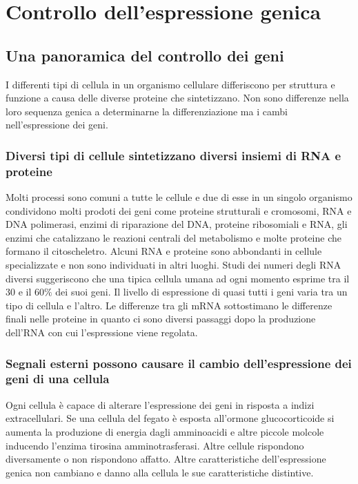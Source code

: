 \chapter{Controllo dell'espressione genica}
\section{Una panoramica del controllo dei geni}
I differenti tipi di cellula in un organismo cellulare differiscono per struttura e funzione a causa delle diverse proteine che sintetizzano. Non sono differenze nella loro sequenza
genica a determinarne la differenziazione ma i cambi nell'espressione dei geni.
\subsection{Diversi tipi di cellule sintetizzano diversi insiemi di RNA e proteine}
Molti processi sono comuni a tutte le cellule e due di esse in un singolo organismo condividono molti prodoti dei geni come proteine strutturali e cromosomi, RNA e DNA polimerasi, enzimi
di riparazione del DNA, proteine ribosomiali e RNA, gli enzimi che catalizzano le reazioni centrali del metabolismo e molte proteine che formano il citoscheletro. Alcuni RNA e proteine
sono abbondanti in cellule specializzate e non sono individuati in altri luoghi. Studi dei numeri degli RNA diversi suggeriscono che una tipica cellula umana ad ogni momento esprime
tra il $30$ e il $60\%$ dei suoi geni. Il livello di espressione di quasi tutti i geni varia tra un tipo di cellula e l'altro. Le differenze tra gli mRNA sottostimano le differenze 
finali nelle proteine in quanto ci sono diversi passaggi dopo la produzione dell'RNA con cui l'espressione viene regolata. 
\subsection{Segnali esterni possono causare il cambio dell'espressione dei geni di una cellula}
Ogni cellula \`e capace di alterare l'espressione dei geni in risposta a indizi extracellulari. Se una cellula del fegato \`e esposta all'ormone glucocorticoide si aumenta la produzione
di energia dagli amminoacidi e altre piccole molcole inducendo l'enzima tirosina amminotrasferasi. Altre cellule rispondono diversamente o non rispondono affatto. Altre caratteristiche
dell'espressione genica non cambiano e danno alla cellula le sue caratteristiche distintive.
